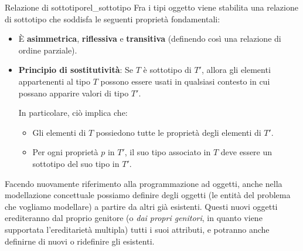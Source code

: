 \documentclass[12pt]{report}
\begin{document}
	\begin{definizione}{Relazione di sottotipo}{rel_sottotipo}
		Fra i tipi oggetto viene stabilita una relazione di sottotipo che soddisfa le seguenti proprietà fondamentali:
		\begin{itemize}
			\item È \textbf{asimmetrica}, \textbf{riflessiva} e \textbf{transitiva} (definendo così una relazione di ordine parziale).
			\item \textbf{Principio di sostitutività}: Se $T$ è sottotipo di $T'$, allora gli elementi appartenenti al tipo $T$ possono essere usati in qualsiasi contesto in cui possano apparire valori di tipo $T'$.
			
			In particolare, ciò implica che:
			\begin{itemize}
				\item Gli elementi di $T$ possiedono tutte le proprietà degli elementi di $T'$.
				\item Per ogni proprietà $p$ in $T'$, il suo tipo associato in $T$ deve essere un sottotipo del suo tipo in $T'$.
			\end{itemize}
		\end{itemize}
	\end{definizione}
	
	Facendo nuovamente riferimento alla programmazione ad oggetti, anche nella modellazione concettuale possiamo definire degli oggetti (le entità del problema che vogliamo modellare) a partire da altri già esistenti. Questi nuovi oggetti erediteranno dal proprio genitore (o \textit{dai propri genitori}, in quanto viene supportata l'ereditarietà multipla) tutti i suoi attributi, e potranno anche definirne di nuovi o ridefinire gli esistenti.
	
\end{document}
